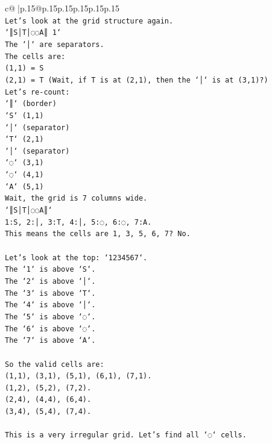 \documentclass{article}
\begin{document}
{\begin{supertabular}{c@{$\;$}|p{.15\linewidth}@{}p{.15\linewidth}p{.15\linewidth}p{.15\linewidth}p{.15\linewidth}p{.15\linewidth}}
{{{\\ 
\texttt{Let's look at the grid structure again.} \\
\texttt{`║S│T│◌◌A║ 1`} \\
\texttt{The `│` are separators.} \\
\texttt{The cells are:} \\
\texttt{(1,1) = S} \\
\texttt{(2,1) = T (Wait, if T is at (2,1), then the `│` is at (3,1)?)} \\
\texttt{Let's re{-}count:} \\
\texttt{`║` (border)} \\
\texttt{`S` (1,1)} \\
\texttt{`│` (separator)} \\
\texttt{`T` (2,1)} \\
\texttt{`│` (separator)} \\
\texttt{`◌` (3,1)} \\
\texttt{`◌` (4,1)} \\
\texttt{`A` (5,1)} \\
\texttt{Wait, the grid is 7 columns wide.} \\
\texttt{`║S│T│◌◌A║`} \\
\texttt{1:S, 2:│, 3:T, 4:│, 5:◌, 6:◌, 7:A.} \\
\texttt{This means the cells are 1, 3, 5, 6, 7? No.} \\
\\ 
\texttt{Let's look at the top: `1234567`.} \\
\texttt{The `1` is above `S`.} \\
\texttt{The `2` is above `│`.} \\
\texttt{The `3` is above `T`.} \\
\texttt{The `4` is above `│`.} \\
\texttt{The `5` is above `◌`.} \\
\texttt{The `6` is above `◌`.} \\
\texttt{The `7` is above `A`.} \\
\\ 
\texttt{So the valid cells are:} \\
\texttt{(1,1), (3,1), (5,1), (6,1), (7,1).} \\
\texttt{(1,2), (5,2), (7,2).} \\
\texttt{(2,4), (4,4), (6,4).} \\
\texttt{(3,4), (5,4), (7,4).} \\
\\ 
\texttt{This is a very irregular grid. Let's find all `◌` cells.} \\
}}}
\end{supertabular}}
\end{document}
